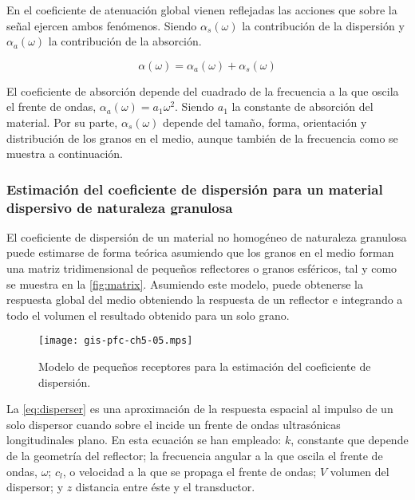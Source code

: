 En el coeficiente de atenuación global vienen reflejadas las acciones que sobre la señal ejercen ambos fenómenos. Siendo $\alpha_s(\omega)$ la contribución de la dispersión y $\alpha_a(\omega)$ la contribución de la absorción.

\begin{equation}
	\alpha(\omega) = \alpha_a(\omega) + \alpha_s(\omega)
	\label{eq:losscoefficient}
\end{equation}

El coeficiente de absorción depende del cuadrado de la frecuencia a la que oscila el frente de ondas, $\alpha_a(\omega) = a_1\omega^2$. Siendo $a_1$ la constante de absorción del material. Por su parte, $\alpha_s(\omega)$ depende del tamaño, forma, orientación y distribución de los granos en el medio, aunque también de la frecuencia como se muestra a continuación.


\subsubsection{Estimación del coeficiente de dispersión para un material dispersivo de naturaleza granulosa}

El coeficiente de dispersión de un material no homogéneo de naturaleza granulosa puede estimarse de forma teórica asumiendo que los granos en el medio forman una matriz tridimensional de pequeños reflectores o granos esféricos, tal y como se muestra en la \vref{fig:matrix}. Asumiendo este modelo, puede obtenerse la respuesta global del medio obteniendo la respuesta de un reflector e integrando a todo el volumen el resultado obtenido para un solo grano.

\begin{figure}
	\begin{center}
		\texttt{[image: gis-pfc-ch5-05.mps]}
	\end{center}
	\caption[Modelo de pequeños receptores]{Modelo de pequeños receptores para la estimación del coeficiente de dispersión.}
	\label{fig:matrix}
\end{figure}

La \vref{eq:disperser} es una aproximación de la respuesta espacial al impulso de un solo dispersor cuando sobre el incide un frente de ondas ultrasónicas longitudinales plano. En esta ecuación se han empleado: $k$, constante que depende de la geometría del reflector; la frecuencia angular a la que oscila el frente de ondas, $\omega$; $c_l$, o velocidad a la que se propaga el frente de ondas; $V$ volumen del dispersor; y $z$ distancia entre éste y el transductor.

